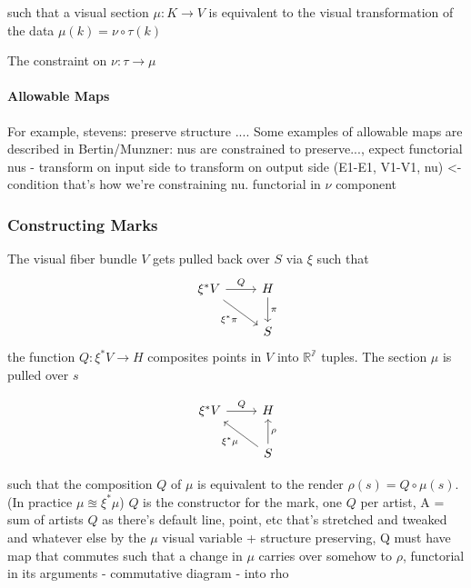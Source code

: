 \documentclass[../main.tex]{subfiles}
\begin{document}
such that a visual section $\mu: K \rightarrow V$  is equivalent to the visual transformation of the data $\mu(k) = \nu\circ\tau(k)$

The constraint on $\nu: \tau\rightarrow \mu$ 


\paragraph{Allowable Maps}
For example, stevens: preserve structure ....
Some examples of allowable maps are described in Bertin/Munzner:
nus are constrained to preserve..., expect functorial nus - transform on input side to transform on output side (E1-E1, V1-V1, nu) <- condition
that's how we're constraining nu. 
functorial in $\nu$ component


\subsubsection{Constructing Marks}
The visual fiber bundle $V$ gets pulled back over $S$ via $\xi$ such that 
\begin{equation}
    \begin{tikzcd}
        \xi^*V \arrow[r, "Q"] \arrow[rd, "\xi^*\pi"'] & H \arrow[d, "\pi"] \\
                                                      & S                 
    \end{tikzcd}
\end{equation}
the function $Q:\xi^*V\rightarrow H$ composites points in $V$ into $\mathbb{R^7}$ tuples. The section $\mu$ is pulled over $s$ 

\begin{equation}
    \begin{tikzcd}
        \xi^*V \arrow[r, "Q"] & H                                           \\
                              & S \arrow[lu, "\xi^*\mu"] \arrow[u, "\rho"']
    \end{tikzcd}
\end{equation}

such that the composition $Q$ of $\mu$ is equivalent to the render $\rho(s) = Q\circ\mu(s)$. 
(In practice $\mu \approxeq \xi^*\mu$)
$Q$ is the constructor for the mark, 
one $Q$ per artist, A = sum of artists
$Q$ as there's default line, point, etc that's stretched and tweaked and whatever else by the $\mu$
visual variable + structure preserving, Q must have map that commutes such that a change in $\mu$ carries over somehow to $\rho$, functorial in its arguments - commutative diagram - into rho
\end{document}
